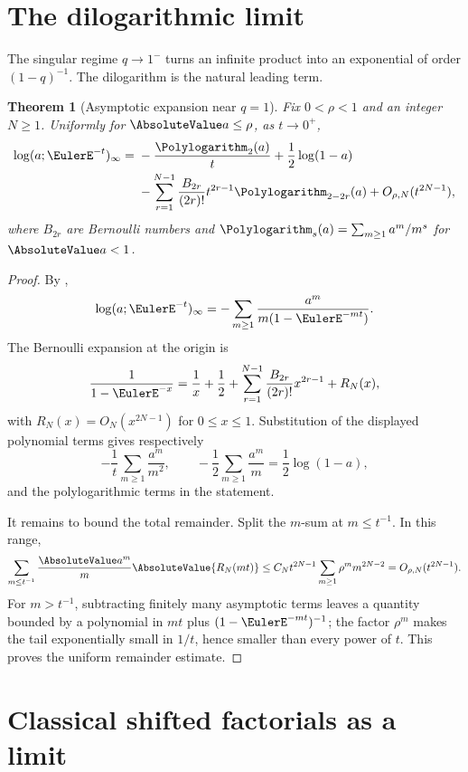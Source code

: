\documentclass[11pt,a4paper,oneside,openany]{book}
\newtheorem{theorem}{Theorem}[chapter]
\theoremstyle{definition}
\theoremstyle{remark}
\begin{document}
\section{The dilogarithmic limit}

The singular regime $q\to1^-$ turns an infinite product into an exponential of order $(1-q)^{-1}$.  The dilogarithm is the natural leading term.

\begin{theorem}[Asymptotic expansion near $q=1$]\label{thm:poch-dilog}
Fix $0<\rho<1$ and an integer $N\ge1$.  Uniformly for $\AbsoluteValue a\le\rho$, as $t\to0^+$,
\[
\begin{aligned}
 \log(a;\EulerE^{-t})_\infty
 ={}&-\frac{\Polylogarithm_2(a)}{t}+\frac12\log(1-a)\\
 &-\sum_{r=1}^{N-1}\frac{B_{2r}}{(2r)!}
 t^{2r-1}\Polylogarithm_{2-2r}(a)+O_{\rho,N}(t^{2N-1}),
\end{aligned}
\]
where $B_{2r}$ are Bernoulli numbers and
\(
 \Polylogarithm_s(a)=\sum_{m\ge1}a^m/m^s
\)
for $\AbsoluteValue a<1$.
\end{theorem}

\begin{proof}
By ,
\[
 \log(a;\EulerE^{-t})_\infty
 =-\sum_{m\ge1}\frac{a^m}{m(1-\EulerE^{-mt})}.
\]
The Bernoulli expansion at the origin is
\[
 \frac1{1-\EulerE^{-x}}
 =\frac1x+\frac12+\sum_{r=1}^{N-1}
 \frac{B_{2r}}{(2r)!}x^{2r-1}+R_N(x),
\]
with $R_N(x)=O_N(x^{2N-1})$ for $0\le x\le1$.  Substitution of the displayed polynomial terms gives respectively
\[
 -\frac1t\sum_{m\ge1}\frac{a^m}{m^2},
 \qquad
 -\frac12\sum_{m\ge1}\frac{a^m}{m}=\frac12\log(1-a),
\]
and the polylogarithmic terms in the statement.

It remains to bound the total remainder.  Split the $m$-sum at $m\le t^{-1}$.  In this range,
\[
 \sum_{m\le t^{-1}}\frac{\AbsoluteValue a^m}{m}\AbsoluteValue{R_N(mt)}
 \le C_Nt^{2N-1}\sum_{m\ge1}\rho^m m^{2N-2}
 =O_{\rho,N}(t^{2N-1}).
\]
For $m>t^{-1}$, subtracting finitely many asymptotic terms leaves a quantity bounded by a polynomial in $mt$ plus $(1-\EulerE^{-mt})^{-1}$; the factor $\rho^m$ makes the tail exponentially small in $1/t$, hence smaller than every power of $t$.  This proves the uniform remainder estimate.
\end{proof}

\section{Classical shifted factorials as a limit}
\end{document}
